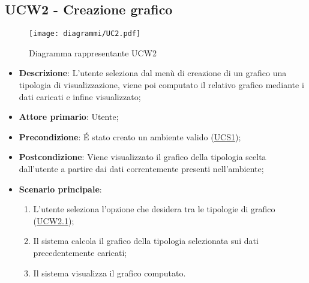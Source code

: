 \subsection{UCW2 - Creazione grafico}
\label{sub:ucw2}

\begin{figure}[h]
    \centering
    \texttt{[image: diagrammi/UC2.pdf]}
    \caption{Diagramma rappresentante UCW2}
    \label{fig:UCW2}
\end{figure}


\begin{itemize}
	\item \textbf{Descrizione}: L’utente seleziona dal menù di creazione di un grafico una tipologia di 
	visualizzazione, viene poi computato il relativo grafico mediante i dati caricati e infine visualizzato;
	
    \item \textbf{Attore primario}: Utente;
    
    \item \textbf{Precondizione}: É stato creato un ambiente valido (\hyperref[sub:ucs1]{UCS1});

	\item \textbf{Postcondizione}:  Viene visualizzato il grafico della tipologia scelta dall'utente a partire dai dati 
	correntemente presenti nell'ambiente; 

	\item \textbf{Scenario principale}:
		\begin{enumerate}
			\item L'utente seleziona l'opzione che desidera tra le tipologie di grafico (\hyperref[ssub:ucw2.1]{UCW2.1});
			\item Il sistema calcola il grafico della tipologia selezionata sui dati precedentemente caricati;
			\item Il sistema visualizza il grafico computato.
		\end{enumerate}
\end{itemize}

